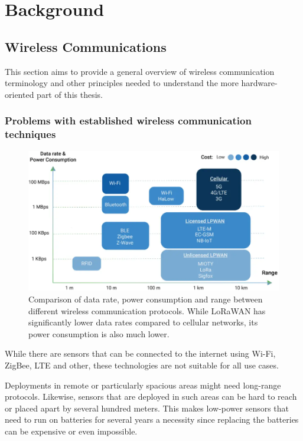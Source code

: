\chapter{Background}

\section{Wireless Communications}

This section aims to provide a general overview of wireless communication terminology and other principles needed to understand the more hardware-oriented part of this thesis.

\subsection{Problems with established wireless communication techniques}

\begin{figure}[htbp]
    \centering
    \includegraphics[width=1\textwidth]{pictures/lora/comparison-wireless-protocols.png}
    \caption{
        Comparison of data rate, power consumption and range between different wireless communication protocols.
        While \ac{LoRaWAN} has significantly lower data rates compared to cellular networks, its power consumption is also much lower.~\protect\cite{wang_comparison_2021}
    }\label{pic:wireless-protocols-comparison}
\end{figure}

While there are sensors that can be connected to the internet using Wi-Fi, ZigBee, \ac{LTE} and other, these technologies are not suitable for all use cases.

Deployments in remote or particularly spacious areas might need long-range protocols.
Likewise, sensors that are deployed in such areas can be hard to reach or placed apart by several hundred meters.
This makes low-power sensors that need to run on batteries for several years a necessity since replacing the batteries can be expensive or even impossible.

